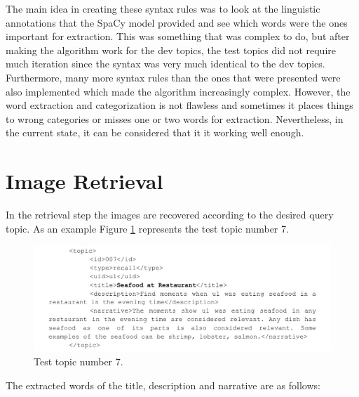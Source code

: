     

    
    
    The main idea in creating these syntax rules was to look at the linguistic annotations that the SpaCy model provided and see which words were the ones important for extraction. This was something that was complex to do, but after making the algorithm work for the dev topics, the test topics did not require much iteration since the syntax was very much identical to the dev topics. Furthermore, many more syntax rules than the ones that were presented were also implemented which made the algorithm increasingly complex.
    However, the word extraction and categorization is not flawless and sometimes it places things to wrong categories or misses one or two words for extraction. Nevertheless, in the current state, it can be considered that it it working well enough. 
        




\section{Image Retrieval}
\label{sec:retrieval}

    In the retrieval step the images are recovered according to the desired query topic.
    As an example Figure \ref{fig:testtopic} represents the test topic number 7.
   
    \begin{figure}[H]
        \centering
        \captionsetup{justification=centering}
        \includegraphics[width = \textwidth]{Sections/6textprocessing/images/topic.png}
        \caption{Test topic number 7.}
        \label{fig:testtopic}
      \end{figure}
      
      The extracted words of the title, description and narrative are as follows:


